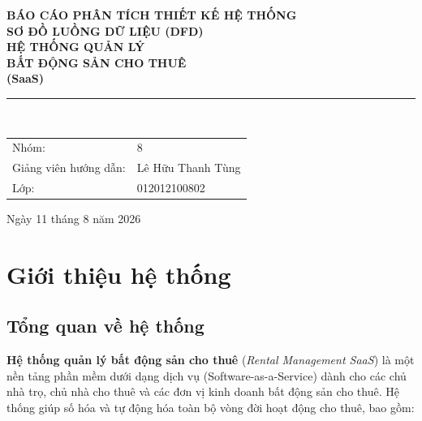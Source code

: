 \documentclass[12pt,a4paper]{report}
\begin{document}
\begin{titlepage}
  \begin{center}
    \vspace*{1cm}

    {\LARGE\bfseries BÁO CÁO PHÂN TÍCH THIẾT KẾ HỆ THỐNG}\\[0.6cm]
    {\LARGE\bfseries SƠ ĐỒ LUỒNG DỮ LIỆU (DFD)}\\[1.6cm]

    {\Huge\bfseries HỆ THỐNG QUẢN LÝ}\\[0.2cm]
    {\Huge\bfseries BẤT ĐỘNG SẢN CHO THUÊ}\\[0.2cm]
    {\LARGE\bfseries (SaaS)}\\[2.2cm]

    \rule{0.7\textwidth}{0.8pt}\\[2.4cm]

    \begin{flushleft}
      \hspace{3.5cm}
      \begin{tabular}{@{}ll@{}}
        Nhóm:                 & 8 \\[0.7cm]
        Giảng viên hướng dẫn: & Lê Hữu Thanh Tùng \\[0.7cm]
        Lớp:                  & 012012100802
      \end{tabular}
    \end{flushleft}

    \vfill
    {\large Ngày 11 tháng 8 năm 2026}
  \end{center}
\end{titlepage}

\tableofcontents
\clearpage
{}

\chapter{Giới thiệu hệ thống}

\section{Tổng quan về hệ thống}

\textbf{Hệ thống quản lý bất động sản cho thuê} (\emph{Rental Management SaaS}) là một nền tảng phần mềm dưới dạng dịch vụ (Software-as-a-Service) dành cho các chủ nhà trọ, chủ nhà cho thuê và các đơn vị kinh doanh bất động sản cho thuê. Hệ thống giúp số hóa và tự động hóa toàn bộ vòng đời hoạt động cho thuê, bao gồm:
\end{document}

